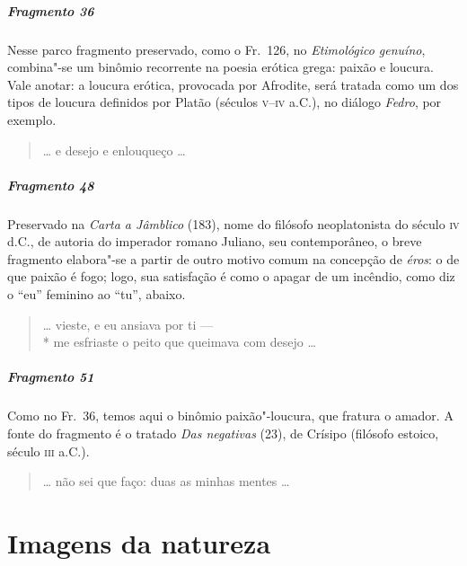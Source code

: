 \paragraph{Fragmento 36}

{\small Nesse parco fragmento preservado, como o Fr.~126, no \textit{Etimológico genuíno}, combina"-se um binômio recorrente na poesia erótica grega:
paixão e loucura. Vale anotar: a loucura erótica, provocada por Afrodite, será
tratada como um dos tipos de loucura definidos por Platão (séculos \textsc{v}--\textsc{iv} a.C.),
no diálogo \textit{Fedro}, por exemplo.}

\begin{verse}
\ldots{} e desejo e enlouqueço \ldots{}
\end{verse}

\paragraph{Fragmento 48}

{\small Preservado na \textit{Carta a Jâmblico} (183), nome do filósofo neoplatonista do
século \textsc{iv} d.C., de autoria do imperador romano Juliano, seu contemporâneo, o
breve fragmento elabora"-se a partir de outro motivo comum na concepção de
\textit{éros}: o de que paixão é fogo; logo, sua satisfação é como o apagar de
um incêndio, como diz o “eu” feminino ao “tu”, abaixo.}

\begin{verse}
\ldots{} vieste, e eu ansiava por ti --- \\*
me esfriaste o peito que queimava com desejo \ldots{}
\end{verse}

\paragraph{Fragmento 51}

{\small Como no Fr.~36, temos aqui o binômio paixão"-loucura, que fratura o amador. A
fonte do fragmento é o tratado \textit{Das negativas} (23), de Crísipo (filósofo
estoico, século \textsc{iii} a.C.).}   \EP[]

\begin{verse}
\ldots{} não sei que faço: duas as minhas mentes \ldots{}
\end{verse}

\chapter{Imagens da natureza}

